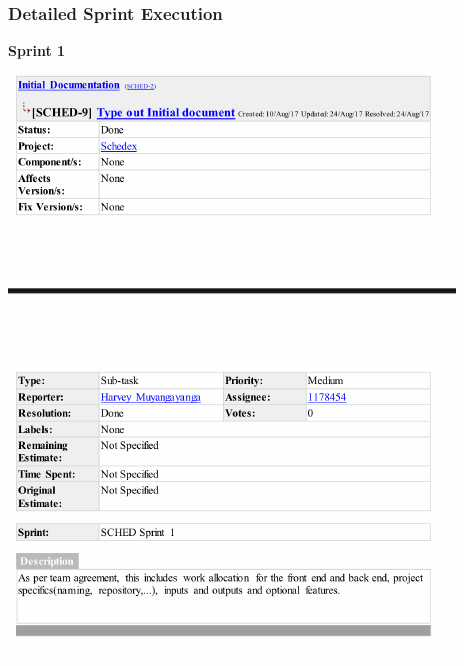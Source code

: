 \documentclass{article}
\begin{document}
\subsubsection{Detailed Sprint Execution}

\textbf{Sprint 1}

\centerline{\includegraphics[scale=1]{sprint1_1}}
\end{document}
